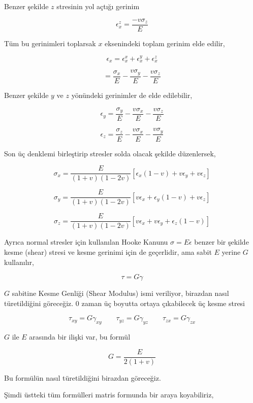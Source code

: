 \documentclass[12pt,fleqn]{article}\usepackage{../../common}
\begin{document}
Benzer şekilde $z$ stresinin yol açtığı gerinim

$$
\epsilon_x^z =  \frac{- v \sigma_z}{E}
$$

Tüm bu gerinimleri toplarsak $x$ eksenindeki toplam gerinim elde edilir,

$$
\epsilon_x = \epsilon_x^x + \epsilon_x^y + \epsilon_x^z
$$

$$
= \frac{\sigma_x}{E} - \frac{v \sigma_y}{E} - \frac{v \sigma_z}{E} 
$$

Benzer şekilde $y$ ve $z$ yönündeki gerinimler de elde edilebilir,

$$
\epsilon_y = \frac{\sigma_y}{E} - \frac{v \sigma_x}{E} - \frac{v \sigma_z}{E} 
$$

$$
\epsilon_z = \frac{\sigma_z}{E} - \frac{v \sigma_x}{E} - \frac{v \sigma_y}{E} 
$$

Son üç denklemi birleştirip stresler solda olacak şekilde düzenlersek,

$$
\sigma_x = \frac{E}{(1+v)(1-2v)} [\epsilon_x (1-v) + v \epsilon_y + v \epsilon_z ]
$$

$$
\sigma_y = \frac{E}{(1+v)(1-2v)} [ v \epsilon_x + \epsilon_y (1-v) + v \epsilon_z  ]
$$

$$
\sigma_z = \frac{E}{(1+v)(1-2v)} [v \epsilon_x + v \epsilon_y + \epsilon_z (1-v)  ]
$$

Ayrıca normal stresler için kullanılan Hooke Kanunu $\sigma = E \epsilon$ benzer
bir şekilde kesme (shear) stresi ve kesme gerinimi için de geçerlidir, ama
sabit $E$ yerine $G$ kullanılır,

$$
\tau = G \gamma
$$

$G$ sabitine Kesme Genliği (Shear Modulus) ismi veriliyor, birazdan nasıl
türetildiğini göreceğiz. 0 zaman üç boyutta ortaya çıkabilecek üç kesme
stresi

$$
\tau_{xy} = G \gamma_{xy} \qquad 
\tau_{yz} = G \gamma_{yz} \qquad 
\tau_{zx} = G \gamma_{zx}
$$

$G$ ile $E$ arasında bir ilişki var, bu formül

$$
G = \frac{E}{2(1+v)}
$$

Bu formülün nasıl türetildiğini birazdan göreceğiz.

Şimdi üstteki tüm formülleri matris formunda bir araya koyabiliriz,
\end{document}
